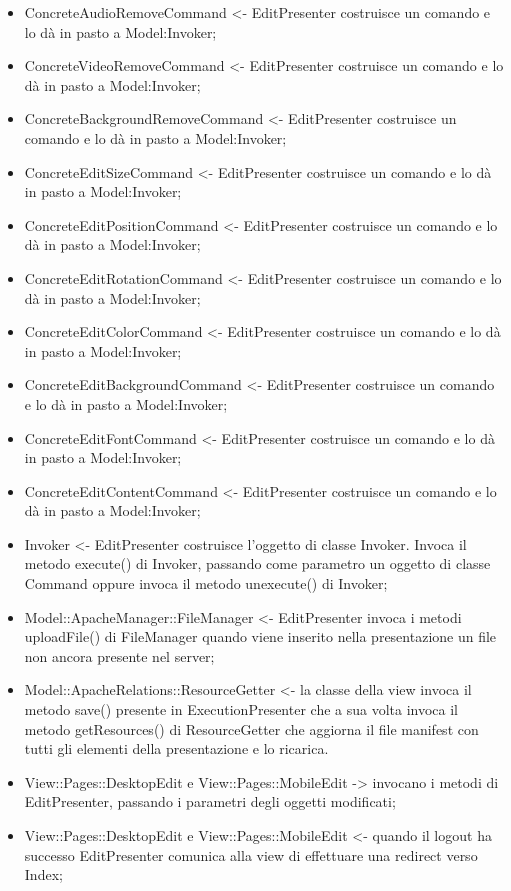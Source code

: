 {{\begin{itemize}
			\item ConcreteAudioRemoveCommand <- EditPresenter costruisce un comando e lo dà in pasto a Model:Invoker;
			\item ConcreteVideoRemoveCommand <- EditPresenter costruisce un comando e lo dà in pasto a Model:Invoker;
			\item ConcreteBackgroundRemoveCommand <- EditPresenter costruisce un comando e lo dà in pasto a Model:Invoker;
			\item ConcreteEditSizeCommand <- EditPresenter costruisce un comando e lo dà in pasto a Model:Invoker;
			\item ConcreteEditPositionCommand <- EditPresenter costruisce un comando e lo dà in pasto a Model:Invoker;
			\item ConcreteEditRotationCommand <- EditPresenter costruisce un comando e lo dà in pasto a Model:Invoker;
			\item ConcreteEditColorCommand <- EditPresenter costruisce un comando e lo dà in pasto a Model:Invoker;
			\item ConcreteEditBackgroundCommand <- EditPresenter costruisce un comando e lo dà in pasto a Model:Invoker;
			\item ConcreteEditFontCommand <- EditPresenter costruisce un comando e lo dà in pasto a Model:Invoker;
			\item ConcreteEditContentCommand <- EditPresenter costruisce un comando e lo dà in pasto a Model:Invoker;
			\item Invoker <- EditPresenter costruisce l’oggetto di classe Invoker. Invoca il metodo execute() di Invoker, passando come parametro un oggetto di classe Command oppure invoca il metodo unexecute() di Invoker;
			\item Model::ApacheManager::FileManager <- EditPresenter invoca i metodi uploadFile() di FileManager quando viene inserito nella presentazione un file non ancora presente nel server;
			\item Model::ApacheRelations::ResourceGetter <- la classe della view invoca il metodo save() presente in  ExecutionPresenter che a sua volta invoca il metodo getResources() di ResourceGetter che aggiorna il file manifest con tutti gli elementi della presentazione e lo ricarica.
			\item View::Pages::DesktopEdit e View::Pages::MobileEdit -> invocano i metodi di EditPresenter, passando i parametri degli oggetti modificati;
			\item View::Pages::DesktopEdit e View::Pages::MobileEdit <- quando il logout ha successo EditPresenter comunica alla view di effettuare una redirect verso Index;

\end{itemize}}}
